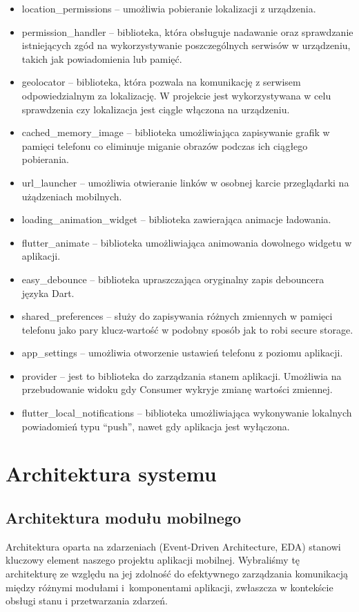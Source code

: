 \documentclass[a4paper,twoside,12pt]{book}
\begin{document}
\begin{itemize}
    \item location\_permissions -- umożliwia pobieranie lokalizacji z urządzenia. 
    \item permission\_handler -- biblioteka, która obsługuje nadawanie oraz sprawdzanie istniejących zgód na wykorzystywanie poszczególnych serwisów w urządzeniu, takich jak powiadomienia lub pamięć. 
    \item geolocator -- biblioteka, która pozwala na komunikację z serwisem odpowiedzialnym za lokalizację. W projekcie jest wykorzystywana w celu sprawdzenia czy lokalizacja jest ciągle włączona na urządzeniu. 
    \item cached\_memory\_image -- biblioteka umożliwiająca zapisywanie grafik w pamięci telefonu co eliminuje miganie obrazów podczas ich ciągłego pobierania.
    \item url\_launcher -- umożliwia otwieranie linków w osobnej karcie przeglądarki na użądzeniach mobilnych. 
    \item loading\_animation\_widget -- biblioteka zawierająca animacje ładowania.
    \item flutter\_animate -- biblioteka umożliwiająca animowania dowolnego widgetu w aplikacji.
    \item easy\_debounce -- biblioteka upraszczająca oryginalny zapis debouncera języka Dart. 
    \item shared\_preferences -- służy do zapisywania różnych zmiennych w pamięci telefonu jako pary klucz-wartość w podobny sposób jak to robi secure storage. 
    \item app\_settings -- umożliwia otworzenie ustawień telefonu z poziomu aplikacji.
    \item provider -- jest to biblioteka do zarządzania stanem aplikacji. Umożliwia na przebudowanie widoku gdy Consumer wykryje zmianę wartości zmiennej.
    \item flutter\_local\_notifications -- biblioteka umożliwiająca wykonywanie lokalnych powiadomień typu ``push'', nawet gdy aplikacja jest wyłączona. 
\end{itemize}
\section{Architektura systemu}
\subsection{Architektura modułu mobilnego}
Architektura oparta na zdarzeniach (Event-Driven Architecture, EDA) stanowi kluczowy element naszego projektu aplikacji mobilnej. Wybraliśmy tę architekturę ze względu na jej zdolność do efektywnego zarządzania komunikacją między różnymi modułami i~komponentami aplikacji, zwłaszcza w kontekście obsługi stanu i przetwarzania zdarzeń.
\end{document}
